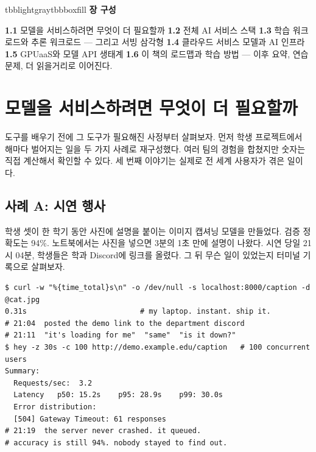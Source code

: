 \vspace{5.0pt}

\begin{calloutbox}{tbblightgray}{tbbboxfill}
{\normalsize\bfseries\color{tbbink}장 구성}\par\vspace{3pt}
\textbf{1.1} 모델을 서비스하려면 무엇이 더 필요할까    \textbf{1.2} 전체 AI 서비스 스택    \textbf{1.3} 학습 워크로드와 추론 워크로드 — 그리고 서빙 삼각형    \textbf{1.4} 클라우드 서비스 모델과 AI 인프라    \textbf{1.5} GPUaaS와 모델 API 생태계    \textbf{1.6} 이 책의 로드맵과 학습 방법 — 이후 요약, 연습문제, 더 읽을거리로 이어진다.
\end{calloutbox}

\section{모델을 서비스하려면 무엇이 더 필요할까}

도구를 배우기 전에 그 도구가 필요해진 사정부터 살펴보자. 먼저 학생 프로젝트에서 해마다 벌어지는 일을 두 가지 사례로 재구성했다. 여러 팀의 경험을 합쳤지만 숫자는 직접 계산해서 확인할 수 있다. 세 번째 이야기는 실제로 전 세계 사용자가 겪은 일이다.

\subsection*{사례 A: 시연 행사}

학생 셋이 한 학기 동안 사진에 설명을 붙이는 이미지 캡셔닝 모델을 만들었다. 검증 정확도는 94\%. 노트북에서는 사진을 넣으면 3분의 1초 만에 설명이 나왔다. 시연 당일 21시 04분, 학생들은 학과 Discord에 링크를 올렸다. 그 뒤 무슨 일이 있었는지 터미널 기록으로 살펴보자.

\begin{terminalbox}
\begin{Verbatim}[breaklines=true,breakanywhere=true,fontsize=\small,formatcom=\color{tbbtermfg},codes=\tbbcodeactive]
$ curl -w "%{time_total}s\n" -o /dev/null -s localhost:8000/caption -d @cat.jpg
0.31s                          # my laptop. instant. ship it.
# 21:04  posted the demo link to the department discord
# 21:11  "it's loading for me"  "same"  "is it down?"
$ hey -z 30s -c 100 http://demo.example.edu/caption   # 100 concurrent users
Summary:
  Requests/sec:  3.2
  Latency   p50: 15.2s    p95: 28.9s    p99: 30.0s
  Error distribution:
  [504] Gateway Timeout: 61 responses
# 21:19  the server never crashed. it queued.
# accuracy is still 94%. nobody stayed to find out.
\end{Verbatim}
\end{terminalbox}

